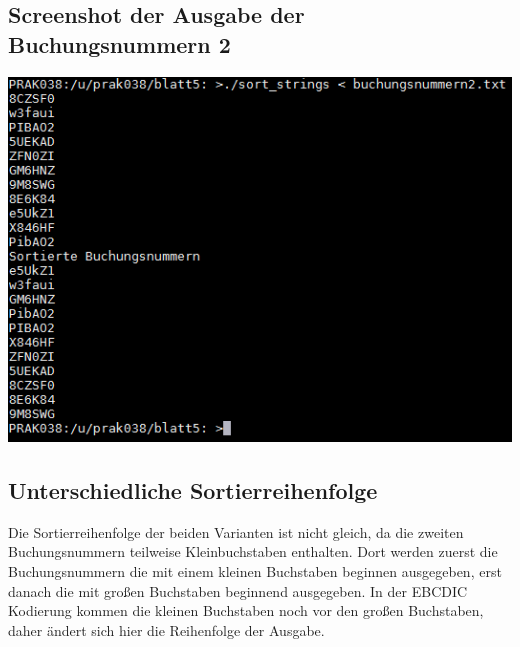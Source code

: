 \documentclass[a4paper]{scrartcl}
\begin{document}
	\subsection{Screenshot der Ausgabe der Buchungsnummern 2}
	\includegraphics{screenshots/2_RUN_2.png}
	
	\subsection{Unterschiedliche Sortierreihenfolge}
	Die Sortierreihenfolge der beiden Varianten ist nicht gleich, da die zweiten Buchungsnummern teilweise Kleinbuchstaben enthalten. Dort werden zuerst die Buchungsnummern die mit einem kleinen Buchstaben beginnen ausgegeben, erst danach die mit großen Buchstaben beginnend ausgegeben. In der EBCDIC Kodierung kommen die kleinen Buchstaben noch vor den großen Buchstaben, daher ändert sich hier die Reihenfolge der Ausgabe.
\end{document}
